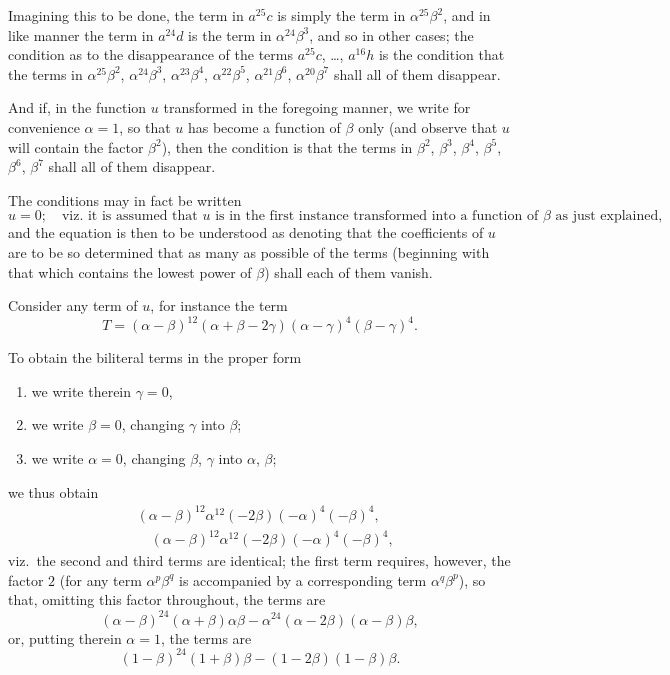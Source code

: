 \documentclass[11pt,a4paper]{article}
\theoremstyle{definition}
\begin{document}
Imagining this to be done, the term in $a^{25}c$ is simply the term in $\alpha^{25}\beta^2$, and in like manner the term in $a^{24}d$ is the term in $\alpha^{24}\beta^3$, and so in other cases; the condition as to the disappearance of the terms $a^{25}c$, \ldots, $a^{16}h$ is the condition that the terms in $\alpha^{25}\beta^2$, $\alpha^{24}\beta^3$, $\alpha^{23}\beta^4$, $\alpha^{22}\beta^5$, $\alpha^{21}\beta^6$, $\alpha^{20}\beta^7$ shall all of them disappear.

And if, in the function $u$ transformed in the foregoing manner, we write for convenience $\alpha = 1$, so that $u$ has become a function of $\beta$ only (and observe that $u$ will contain the factor $\beta^2$), then the condition is that the terms in $\beta^2$, $\beta^3$, $\beta^4$, $\beta^5$, $\beta^6$, $\beta^7$ shall all of them disappear.

The conditions may in fact be written
\[
u = 0; \quad \text{viz.\ it is assumed that $u$ is in the first instance transformed into a function of $\beta$ as just explained,}
\]
and the equation is then to be understood as denoting that the coefficients of $u$ are to be so determined that as many as possible of the terms (beginning with that which contains the lowest power of $\beta$) shall each of them vanish.

Consider any term of $u$, for instance the term
\[
T = (\alpha - \beta)^{12}(\alpha + \beta - 2\gamma)(\alpha - \gamma)^4(\beta - \gamma)^4.
\]

To obtain the biliteral terms in the proper form
\begin{enumerate}[label=\arabic*.]
\item we write therein $\gamma = 0$,
\item we write $\beta = 0$, changing $\gamma$ into $\beta$;
\item we write $\alpha = 0$, changing $\beta$, $\gamma$ into $\alpha$, $\beta$;
\end{enumerate}
we thus obtain
\begin{align*}
&(\alpha - \beta)^{12} \alpha^{12} (-2\beta)(-\alpha)^4(-\beta)^4,\\
&\quad (\alpha - \beta)^{12} \alpha^{12} (-2\beta)(-\alpha)^4(-\beta)^4,
\end{align*}
viz.\ the second and third terms are identical; the first term requires, however, the factor $2$ (for any term $\alpha^p\beta^q$ is accompanied by a corresponding term $\alpha^q\beta^p$), so that, omitting this factor throughout, the terms are
\[
(\alpha - \beta)^{24}(\alpha + \beta)\alpha\beta - \alpha^{24}(\alpha - 2\beta)(\alpha - \beta)\beta,
\]
or, putting therein $\alpha = 1$, the terms are
\[
(1 - \beta)^{24}(1 + \beta)\beta - (1 - 2\beta)(1 - \beta)\beta.
\]
\end{document}
